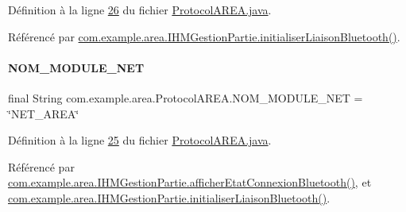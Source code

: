 Définition à la ligne \hyperlink{_protocol_a_r_e_a_8java_source_l00026}{26} du fichier \hyperlink{_protocol_a_r_e_a_8java_source}{Protocol\+A\+R\+E\+A.\+java}.



Référencé par \hyperlink{_i_h_m_gestion_partie_8java_source_l00329}{com.\+example.\+area.\+I\+H\+M\+Gestion\+Partie.\+initialiser\+Liaison\+Bluetooth()}.

\mbox{\label{classcom_1_1example_1_1area_1_1_protocol_a_r_e_a_a77e082eb863a4839d0f1e885b31594e2}} 
\paragraph{\texorpdfstring{N\+O\+M\+\_\+\+M\+O\+D\+U\+L\+E\+\_\+\+N\+ET}{NOM\_MODULE\_NET}}
{\footnotesize\ttfamily final String com.\+example.\+area.\+Protocol\+A\+R\+E\+A.\+N\+O\+M\+\_\+\+M\+O\+D\+U\+L\+E\+\_\+\+N\+ET = \char`\"{}N\+E\+T\+\_\+\+A\+R\+EA\char`\"{}\hspace{0.3cm}{\ttfamily [static]}}



Définition à la ligne \hyperlink{_protocol_a_r_e_a_8java_source_l00025}{25} du fichier \hyperlink{_protocol_a_r_e_a_8java_source}{Protocol\+A\+R\+E\+A.\+java}.



Référencé par \hyperlink{_i_h_m_gestion_partie_8java_source_l00488}{com.\+example.\+area.\+I\+H\+M\+Gestion\+Partie.\+afficher\+Etat\+Connexion\+Bluetooth()}, et \hyperlink{_i_h_m_gestion_partie_8java_source_l00329}{com.\+example.\+area.\+I\+H\+M\+Gestion\+Partie.\+initialiser\+Liaison\+Bluetooth()}.

\mbox{\label{classcom_1_1example_1_1area_1_1_protocol_a_r_e_a_a4cc039bb2f3b605eb461b38dca05d22d}} 
